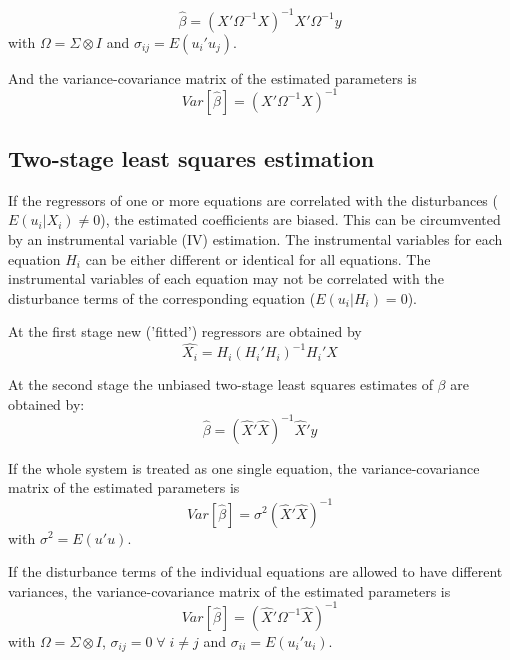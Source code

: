 \begin{equation}
   \widehat{\beta} = \left( X' \Omega^{-1} X \right)^{-1} X' \Omega^{-1} y
\end{equation}
with $\Omega = \Sigma \otimes I$ and
$\sigma_{ij} = E \left( u_i' u_j \right)$.

And the variance-covariance matrix of the estimated parameters is
\begin{equation}
   Var \left[ \widehat{\beta} \right] = \left( X' \Omega^{-1} X \right)^{-1}
\end{equation}


\subsection{Two-stage least squares estimation}

If the regressors of one or more equations are correlated 
with the disturbances ($E \left( u_i | X_i \right) \neq 0$), 
the estimated coefficients are biased.
This can be circumvented by an instrumental variable (IV) estimation.
The instrumental variables for each equation $H_i$ 
can be either different or identical for all equations.
The instrumental variables of each equation may not be correlated with 
the disturbance terms of the corresponding equation 
($E \left( u_i | H_i \right) = 0$).

At the first stage new ('fitted') regressors are obtained by
\begin{equation}
   \widehat{X_i} = H_i \left( H_i' H_i \right)^{-1} H_i' X
\end{equation}

At the second stage the unbiased two-stage least squares estimates
of $\beta$ are obtained by:
\begin{equation}
   \widehat{\beta} = \left( \widehat{X}' \widehat{X} \right)^{-1} 
   \widehat{X}' y 
   \label{eq:beta2sls}
\end{equation}

If the whole system is treated as one single equation, 
the variance-covariance matrix of the estimated parameters is
\begin{equation}
   Var \left[ \widehat{\beta} \right] = \sigma^2 \left( \widehat{X}'
   \widehat{X} \right)^{-1}
\end{equation}
with $\sigma^2 = E \left( u' u \right)$.

If the disturbance terms of the individual equations 
are allowed to have different variances, 
the variance-covariance matrix of the estimated parameters is
\begin{equation}
   Var \left[ \widehat{\beta} \right] = \left( \widehat{X}' \Omega^{-1} 
   \widehat{X} \right)^{-1}
\end{equation}
with $\Omega = \Sigma \otimes I$, 
$\sigma_{ij} = 0 \; \forall \; i \neq j$ and
$\sigma_{ii} = E \left( u_i' u_i \right)$.


